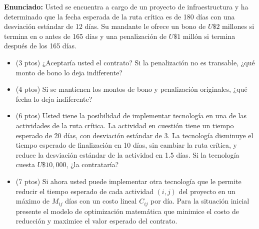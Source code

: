 \documentclass[11pt, a4paper]{article}
\begin{document}
  \textbf{Enunciado:}
  Usted se encuentra a cargo de un proyecto de infraestructura y ha determinado que la fecha esperada de la ruta crítica es de 180 días con una desviación estándar de 12 días. Su mandante le ofrece un bono de $U\$2$ millones si termina en o antes de 165 días y una penalización de $U\$1$ millón si termina después de los 165 días.

  \begin{itemize}
    \item[\textbf{i.}] (3 ptos) ¿Aceptaría usted el contrato? Si la penalización no es transable, ¿qué monto de bono lo deja indiferente?
    \item[\textbf{ii.}] (4 ptos) Si se mantienen los montos de bono y penalización originales, ¿qué fecha lo deja indiferente?
    \item[\textbf{iii.}] (6 ptos) Usted tiene la posibilidad de implementar tecnología en una de las actividades de la ruta crítica. La actividad en cuestión tiene un tiempo esperado de 20 días, con desviación estándar de 3. La tecnología disminuye el tiempo esperado de finalización en 10 días, sin cambiar la ruta crítica, y reduce la desviación estándar de la actividad en 1.5 días. Si la tecnología cuesta $U\$10,000$, ¿la contrataría?
    \item[\textbf{iv.}] (7 ptos) Si ahora usted puede implementar otra tecnología que le permite reducir el tiempo esperado de cada actividad $(i,j)$ del proyecto en un máximo de $M_{ij}$ días con un costo lineal $C_{ij}$ por día. Para la situación inicial presente el modelo de optimización matemática que minimice el costo de reducción y maximice el valor esperado del contrato.
  \end{itemize}
\end{document}
